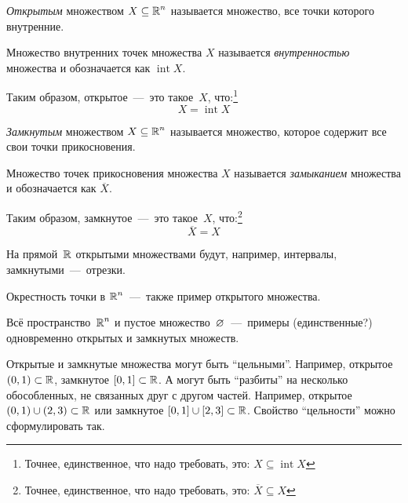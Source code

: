 \documentclass[a4paper,12pt]{article}
\begin{document}

  \begin{definition}
      \emph{Открытым} множеством $X \subseteq \operatorname{\mathbb R}^n$ называется множество, все точки которого внутренние.

      Множество внутренних точек множества $X$ называется \emph{внутренностью} множества и обозначается как $\operatorname{int} X$.

      Таким образом, открытое~---~это такое~$X$, что:\footnote{
        Точнее, единственное, что надо требовать, это: $X \subseteq \operatorname{int} X$
      }
      \[
        X = \operatorname{int} X
      \]
  \end{definition}

  \begin{definition}
      \emph{Замкнутым} множеством $X \subseteq \operatorname{\mathbb R}^n$ называется множество, которое содержит все свои точки прикосновения.

      Множество точек прикосновения множества $X$ называется \emph{замыканием} множества и обозначается как $\overline X$.

      Таким образом, замкнутое~---~это такое~$X$, что:\footnote{
        Точнее, единственное, что надо требовать, это: $\overline X \subseteq X$
      }
      \[
        \overline X = X
      \]
  \end{definition}

  \begin{example}
    На прямой~$\operatorname{\mathbb R}$ открытыми множествами будут, например, интервалы, замкнутыми~---~отрезки.

    Окрестность точки в $\operatorname{\mathbb R}^n$~---~также пример открытого множества.

    Всё пространство~$\operatorname{\mathbb R}^n$ и пустое множество~$\varnothing$~---~примеры (единственные?) одновременно открытых и замкнутых множеств.
  \end{example}

  Открытые и замкнутые множества могут быть ``цельными''.
  Например, открытое $(0, 1) \hm\subset \RR$, замкнутое $[0, 1] \hm\subset \RR$.
  А могут быть ``разбиты'' на несколько обособленных, не связанных друг с другом частей.
  Например, открытое $(0, 1) \hm\cup (2, 3) \subset \RR$ или замкнутое $[0, 1] \hm\cup [2, 3] \subset \RR$.
  Свойство ``цельности'' можно сформулировать так.
\end{document}
